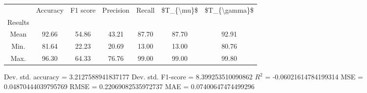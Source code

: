 \begin{tabular}{|c|c|c|c|c|c|c|}
\toprule
{} &  Accuracy &  F1 score &  Precision &  Recall &  \$T\_\{\textbackslash mu\}\$ &  \$T\_\{\textbackslash gamma\}\$ \\
Results &           &           &            &         &            &               \\
\hline
Mean    &     92.66 &     54.86 &      43.21 &   87.70 &      87.70 &         92.91 \\
Min.    &     81.64 &     22.23 &      20.69 &   13.00 &      13.00 &         80.76 \\
Max.    &     96.30 &     64.33 &      76.76 &   99.00 &      99.00 &         99.80 \\
\bottomrule
\end{tabular}

 Dev. std. accuracy = 3.2127588941837177
 Dev. std. F1-score = 8.399253510090862
 $R^2$ = -0.06021614784199314
 MSE = 0.04870444039795769
 RMSE = 0.22069082535972737
 MAE = 0.07400647474499296
